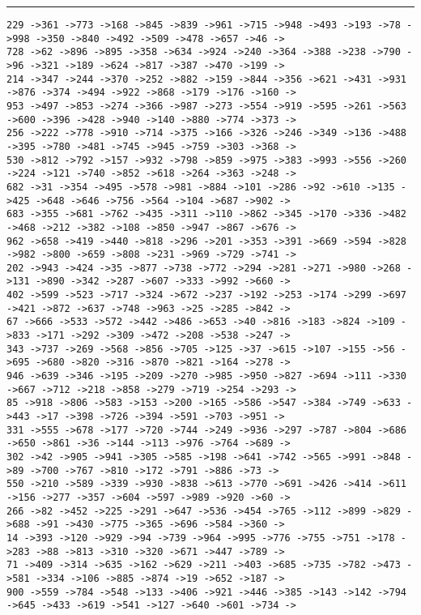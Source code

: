 \documentclass[letter, 12pt]{article}
\newenvironment{question}[1]{%
    \vspace{.2in}%
        \noindent{\bf #1}%
    \vspace{0.3em} \hrule \vspace{.1in}%
}{}
\begin{document}
\begin{question}{\large Appendix}
\begin{lstlisting}[style=CStyle]
229 ->361 ->773 ->168 ->845 ->839 ->961 ->715 ->948 ->493 ->193 ->78 ->998 ->350 ->840 ->492 ->509 ->478 ->657 ->46 ->
728 ->62 ->896 ->895 ->358 ->634 ->924 ->240 ->364 ->388 ->238 ->790 ->96 ->321 ->189 ->624 ->817 ->387 ->470 ->199 ->
214 ->347 ->244 ->370 ->252 ->882 ->159 ->844 ->356 ->621 ->431 ->931 ->876 ->374 ->494 ->922 ->868 ->179 ->176 ->160 ->
953 ->497 ->853 ->274 ->366 ->987 ->273 ->554 ->919 ->595 ->261 ->563 ->600 ->396 ->428 ->940 ->140 ->880 ->774 ->373 ->
256 ->222 ->778 ->910 ->714 ->375 ->166 ->326 ->246 ->349 ->136 ->488 ->395 ->780 ->481 ->745 ->945 ->759 ->303 ->368 ->
530 ->812 ->792 ->157 ->932 ->798 ->859 ->975 ->383 ->993 ->556 ->260 ->224 ->121 ->740 ->852 ->618 ->264 ->363 ->248 ->
682 ->31 ->354 ->495 ->578 ->981 ->884 ->101 ->286 ->92 ->610 ->135 ->425 ->648 ->646 ->756 ->564 ->104 ->687 ->902 ->
683 ->355 ->681 ->762 ->435 ->311 ->110 ->862 ->345 ->170 ->336 ->482 ->468 ->212 ->382 ->108 ->850 ->947 ->867 ->676 ->
962 ->658 ->419 ->440 ->818 ->296 ->201 ->353 ->391 ->669 ->594 ->828 ->982 ->800 ->659 ->808 ->231 ->969 ->729 ->741 ->
202 ->943 ->424 ->35 ->877 ->738 ->772 ->294 ->281 ->271 ->980 ->268 ->131 ->890 ->342 ->287 ->607 ->333 ->992 ->660 ->
402 ->599 ->523 ->717 ->324 ->672 ->237 ->192 ->253 ->174 ->299 ->697 ->421 ->872 ->637 ->748 ->963 ->25 ->285 ->842 ->
67 ->666 ->533 ->572 ->442 ->486 ->653 ->40 ->816 ->183 ->824 ->109 ->833 ->171 ->292 ->309 ->472 ->208 ->538 ->247 ->
343 ->737 ->269 ->568 ->856 ->705 ->125 ->37 ->615 ->107 ->155 ->56 ->695 ->680 ->820 ->316 ->870 ->821 ->164 ->278 ->
946 ->639 ->346 ->195 ->209 ->270 ->985 ->950 ->827 ->694 ->111 ->330 ->667 ->712 ->218 ->858 ->279 ->719 ->254 ->293 ->
85 ->918 ->806 ->583 ->153 ->200 ->165 ->586 ->547 ->384 ->749 ->633 ->443 ->17 ->398 ->726 ->394 ->591 ->703 ->951 ->
331 ->555 ->678 ->177 ->720 ->744 ->249 ->936 ->297 ->787 ->804 ->686 ->650 ->861 ->36 ->144 ->113 ->976 ->764 ->689 ->
302 ->42 ->905 ->941 ->305 ->585 ->198 ->641 ->742 ->565 ->991 ->848 ->89 ->700 ->767 ->810 ->172 ->791 ->886 ->73 ->
550 ->210 ->589 ->339 ->930 ->838 ->613 ->770 ->691 ->426 ->414 ->611 ->156 ->277 ->357 ->604 ->597 ->989 ->920 ->60 ->
266 ->82 ->452 ->225 ->291 ->647 ->536 ->454 ->765 ->112 ->899 ->829 ->688 ->91 ->430 ->775 ->365 ->696 ->584 ->360 ->
14 ->393 ->120 ->929 ->94 ->739 ->964 ->995 ->776 ->755 ->751 ->178 ->283 ->88 ->813 ->310 ->320 ->671 ->447 ->789 ->
71 ->409 ->314 ->635 ->162 ->629 ->211 ->403 ->685 ->735 ->782 ->473 ->581 ->334 ->106 ->885 ->874 ->19 ->652 ->187 ->
900 ->559 ->784 ->548 ->133 ->406 ->921 ->446 ->385 ->143 ->142 ->794 ->645 ->433 ->619 ->541 ->127 ->640 ->601 ->734 ->

\end{lstlisting}
\end{question}
\end{document}

